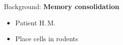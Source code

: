 \documentclass[aspectratio=169]{beamer}
\begin{document}
\begin{frame}{Background: \textbf{Memory consolidation}}
  \begin{block}{}
    \begin{itemize}
    \item Patient H.\,M.
    \item Place cells in rodents
      \end{itemize}
    \end{block}
    
\end{frame}
\end{document}
